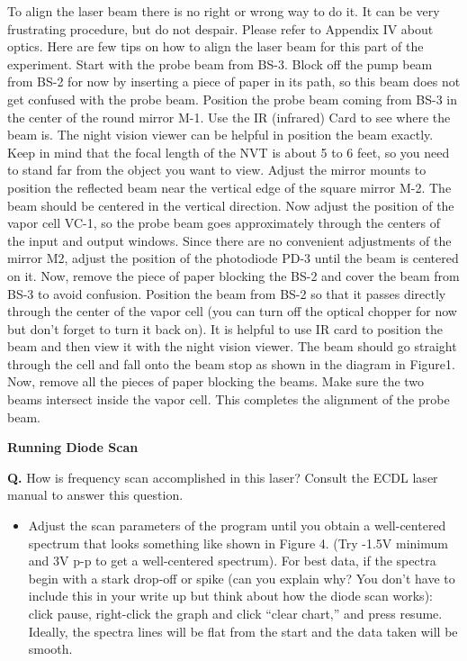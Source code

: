 \documentclass{../lab}
\begin{document}
To align the laser beam there is no right or wrong way to do it. It can be very frustrating procedure, but do not despair. Please refer to Appendix IV about optics. Here are few tips on how to align the laser beam for this part of the experiment. Start with the probe beam from BS-3. Block off the pump beam from BS-2 for now by inserting a piece of paper in its path, so this beam does not get confused with the probe beam. Position the probe beam coming from BS-3 in the center of the round mirror M-1. Use the IR (infrared) Card to see where the beam is. The night vision viewer can be helpful in position the beam exactly. Keep in mind that the focal length of the NVT is about 5 to 6 feet, so you need to stand far from the object you want to view. Adjust the mirror mounts to position the reflected beam near the vertical edge of the square mirror M-2. The beam should be centered in the vertical direction. Now adjust the position of the vapor cell VC-1, so the probe beam goes approximately through the centers of the input and output windows. Since there are no convenient adjustments of the mirror M2, adjust the position of the photodiode PD-3 until the beam is centered on it. Now, remove the piece of paper blocking the BS-2 and cover the beam from BS-3 to avoid confusion. Position the beam from BS-2 so that it passes directly through the center of the vapor cell (you can turn off the optical chopper for now but don't forget to turn it back on). It is helpful to use IR card to position the beam and then view it with the night vision viewer. The beam should go straight through the cell and fall onto the beam stop as shown in the diagram in Figure1. Now, remove all the pieces of paper blocking the beams. Make sure the two beams intersect inside the vapor cell. This completes the alignment of the probe beam.

\textbf{Running Diode Scan}

\textbf{Q.} How is frequency scan accomplished in this laser? Consult the ECDL laser manual to answer this question.

\begin{itemize}
    \item Adjust the scan parameters of the program until you obtain a well-centered spectrum that looks something like shown in Figure 4. (Try -1.5V minimum and 3V p-p to get a well-centered spectrum). For best data, if the spectra begin with a stark drop-off or spike (can you explain why? You don't have to include this in your write up but think about how the diode scan works): click pause, right-click the graph and click ``clear chart,'' and press resume. Ideally, the spectra lines will be flat from the start and the data taken will be smooth.

\end{itemize}
\end{document}
